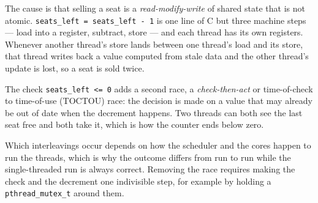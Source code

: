 
The cause is that selling a seat is a \emph{read-modify-write} of shared state
that is not atomic. \texttt{seats\_left = seats\_left - 1} is one line of C but
three machine steps --- load into a register, subtract, store --- and each thread
has its own registers. Whenever another thread's store lands between one
thread's load and its store, that thread writes back a value computed from
stale data and the other thread's update is lost, so a seat is sold twice.

The check \texttt{seats\_left <= 0} adds a second race, a \emph{check-then-act}
or time-of-check to time-of-use (TOCTOU) race: the decision is made on a value
that may already be out of date when the decrement happens. Two threads can
both see the last seat free and both take it, which is how the counter ends
below zero.

Which interleavings occur depends on how the scheduler and the cores happen to
run the threads, which is why the outcome differs from run to run while the
single-threaded run is always correct. Removing the race requires making the
check and the decrement one indivisible step, for example by holding a
\texttt{pthread\_mutex\_t} around them.
